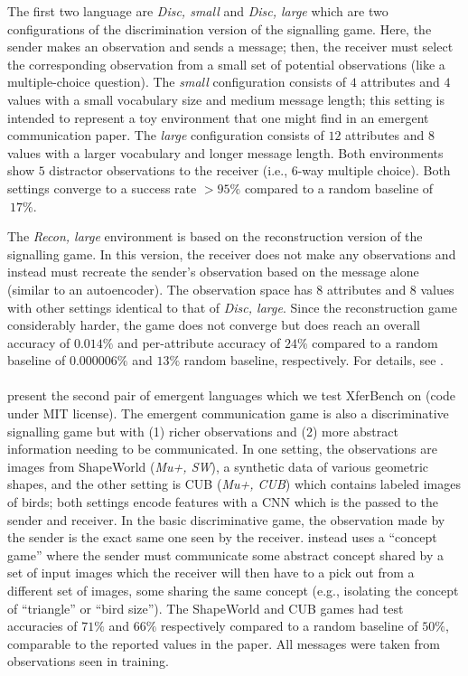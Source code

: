 The first two language are \emph{Disc, small} and \emph{Disc, large} which are two configurations of the discrimination version of the signalling game.
Here, the sender makes an observation and sends a message;
  then, the receiver must select the corresponding observation from a small set of potential observations (like a multiple-choice question).
The \emph{small} configuration consists of $4$ attributes and $4$ values with a small vocabulary size and medium message length;
  this setting is intended to represent a toy environment that one might find in an emergent communication paper.
The \emph{large} configuration consists of $12$ attributes and $8$ values with a larger vocabulary and longer message length.
Both environments show $5$ distractor observations to the receiver (i.e., $6$-way multiple choice).
Both settings converge to a success rate ${>}95\%$ compared to a random baseline of ${~}17\%$.

The \emph{Recon, large} environment is based on the reconstruction version of the signalling game.
In this version, the receiver does not make any observations and instead must recreate the sender's observation based on the message alone (similar to an autoencoder).
The observation space has $8$ attributes and $8$ values with other settings identical to that of \emph{Disc, large}. 
Since the reconstruction game considerably harder, the game does not converge but does reach an overall accuracy of $0.014\%$ and per-attribute accuracy of $24\%$ compared to a random baseline of $0.000006\%$ and $13\%$ random baseline, respectively.
For details, see .

\paragraph{\citet{mu2021generalizations}}
present the second pair of emergent languages which we test XferBench on (code under MIT license).
The emergent communication game is also a discriminative signalling game but with (1) richer observations and (2) more abstract information needing to be communicated.
In one setting, the observations are images from ShapeWorld \citep{Kuhnle2017ShapeWorldA} (\emph{Mu+, SW}), a synthetic data of various geometric shapes, and the other setting is CUB \citep{WahCUB_200_2011} (\emph{Mu+, CUB}) which contains labeled images of birds;
  both settings encode features with a CNN which is the passed to the sender and receiver.
In the basic discriminative game, the observation made by the sender is the exact same one seen by the receiver.
\citet{mu2021generalizations} instead uses a ``concept game'' where the sender must communicate some abstract concept shared by a set of input images which the receiver will then have to a pick out from a different set of images, some sharing the same concept (e.g., isolating the concept of ``triangle'' or ``bird size'').
The ShapeWorld and CUB games had test accuracies of $71\%$ and $66\%$ respectively compared to a random baseline of $50\%$, comparable to the reported values in the paper.
All messages were taken from observations seen in training.

